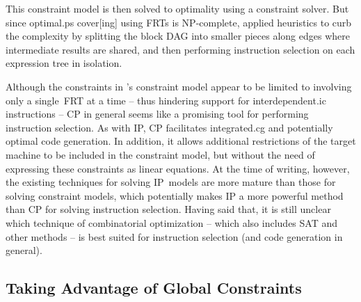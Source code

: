 This \gls{constraint model} is then solved to optimality using a \gls{constraint
  solver}.
%
But since \gls{optimal.ps} \gls{cover}[ing] using \glspl{FRT} is NP-complete,
\citeauthor{BashfordLeupers:1999} applied heuristics to curb the complexity by
splitting the \gls{block DAG} into smaller pieces along \glspl{edge} where
intermediate results are shared, and then performing \gls{instruction selection}
on each \gls{expression tree} in isolation.

Although the \glspl{constraint} in \citeauthor{BashfordLeupers:1999}'s
\gls{constraint model} appear to be limited to involving only a single~\gls{FRT}
at a time -- thus hindering support for \gls{interdependent.ic}
\glspl{instruction} -- \glsdesc{CP} in general seems like a promising tool for
performing \gls{instruction selection}.
%
As with \glsdesc{IP}, \glsdesc{CP} facilitates \gls{integrated.cg} and
potentially optimal \gls{code generation}.
%
In addition, it allows additional restrictions of the \gls{target machine} to be
included in the \gls{constraint model}, but without the need of expressing these
\glspl{constraint} as linear equations.
%
At the time of writing, however, the existing techniques for solving
\gls{IP}~models are more mature than those for solving \glspl{constraint model},
which potentially makes \glsdesc{IP} a more powerful method than \glsdesc{CP}
for solving \gls{instruction selection}.
%
Having said that, it is still unclear which technique of combinatorial
optimization -- which also includes \gls{SAT} and other methods -- is best
suited for \gls{instruction selection} (and code generation in general).


\subsection{Taking Advantage of Global Constraints}

